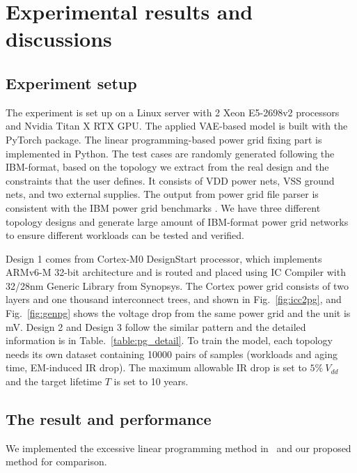 \section{Experimental results and discussions}
\label{sec:results}
\subsection{Experiment setup}
The experiment is set up on a Linux server with 2 Xeon E5-2698v2 processors and Nvidia Titan X RTX GPU. 
The applied VAE-based model is built with the PyTorch package. 
The linear programming-based power grid fixing part is implemented in Python.
The test cases are randomly generated following the IBM-format, based on the topology we extract from the real design and the constraints that the user defines.
It consists of VDD power nets, VSS ground nets, and two external supplies.
The output from power grid file parser is consistent with the IBM power grid benchmarks \cite{Nassif:ASPDAC'08}.
We have three different topology designs and generate large amount of IBM-format power grid networks to ensure different workloads can be tested and verified. 

Design 1 comes from Cortex-M0 DesignStart processor, which implements ARMv6-M 32-bit architecture and is routed and placed using IC Compiler with 32/28nm Generic Library from Synopsys. 
The Cortex power grid consists of two layers and one thousand interconnect trees, and shown in Fig.~\ref{fig:icc2pg},  and Fig.~\ref{fig:genpg} shows the voltage drop from the same power grid and the unit is mV.
Design 2 and Design 3 follow the similar pattern and the detailed information is in Table.~\ref{table:pg_detail}.
To train the model, each topology needs its own dataset containing 10000 pairs of samples  (workloads and aging time, EM-induced IR drop). The maximum allowable IR drop is set to $5\% \ V_{dd}$ and the target lifetime $T$ is set to 10 years. 




\subsection{The result and performance}
We implemented the excessive linear programming method in~\cite{Sukharev:2019pg} and our proposed method for comparison. 

